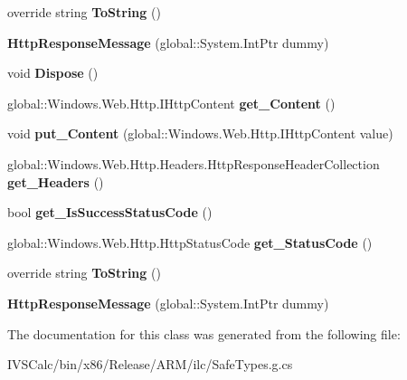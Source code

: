 \begin{DoxyCompactItemize}
override string {\bfseries To\+String} ()
\item 
\mbox{\label{class_windows_1_1_web_1_1_http_1_1_http_response_message_abf9eacfb0122fbb37c4cefbe6027c1bb}} 
{\bfseries Http\+Response\+Message} (global\+::\+System.\+Int\+Ptr dummy)
\item 
\mbox{\label{class_windows_1_1_web_1_1_http_1_1_http_response_message_a79ea29d0bc40d8bc64102d96f59aebf4}} 
void {\bfseries Dispose} ()
\item 
\mbox{\label{class_windows_1_1_web_1_1_http_1_1_http_response_message_aa742acc5e70c1d817b438ea41be4de12}} 
global\+::\+Windows.\+Web.\+Http.\+I\+Http\+Content {\bfseries get\+\_\+\+Content} ()
\item 
\mbox{\label{class_windows_1_1_web_1_1_http_1_1_http_response_message_a3cb8022988b8e1a2586f7a102281c88c}} 
void {\bfseries put\+\_\+\+Content} (global\+::\+Windows.\+Web.\+Http.\+I\+Http\+Content value)
\item 
\mbox{\label{class_windows_1_1_web_1_1_http_1_1_http_response_message_aaca34cdc610c5bae128167860b27d451}} 
global\+::\+Windows.\+Web.\+Http.\+Headers.\+Http\+Response\+Header\+Collection {\bfseries get\+\_\+\+Headers} ()
\item 
\mbox{\label{class_windows_1_1_web_1_1_http_1_1_http_response_message_a91963a9e973727c0e5c97fcc0ead8060}} 
bool {\bfseries get\+\_\+\+Is\+Success\+Status\+Code} ()
\item 
\mbox{\label{class_windows_1_1_web_1_1_http_1_1_http_response_message_a559b5594bd74d83fdc6617968b8a0d95}} 
global\+::\+Windows.\+Web.\+Http.\+Http\+Status\+Code {\bfseries get\+\_\+\+Status\+Code} ()
\item 
\mbox{\label{class_windows_1_1_web_1_1_http_1_1_http_response_message_a41a46b8ee759bbf5b15b954f928eb816}} 
override string {\bfseries To\+String} ()
\item 
\mbox{\label{class_windows_1_1_web_1_1_http_1_1_http_response_message_abf9eacfb0122fbb37c4cefbe6027c1bb}} 
{\bfseries Http\+Response\+Message} (global\+::\+System.\+Int\+Ptr dummy)
\end{DoxyCompactItemize}


The documentation for this class was generated from the following file\+:\begin{DoxyCompactItemize}
\item 
I\+V\+S\+Calc/bin/x86/\+Release/\+A\+R\+M/ilc/Safe\+Types.\+g.\+cs\end{DoxyCompactItemize}
